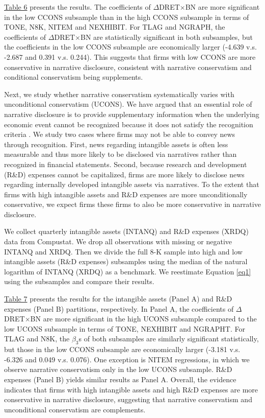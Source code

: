 \documentclass[letterpaper,12pt]{article}
\begin{document}
\begin{spacing}{1.5}
\hyperref[T6]{Table 6} presents the results. The coefficients of $\Delta$DRET$\times$BN are more significant in the low CCONS subsample than in the high CCONS subsample in terms of TONE, N8K, NITEM and NEXHIBIT. For TLAG and NGRAPH, the coefficients of $\Delta$DRET$\times$BN are statistically significant in both subsamples, but the coefficients in the low CCONS subsample are economically larger (-4.639 v.s. -2.687 and 0.391 v.s. 0.244). This suggests that firms with low CCONS are more conservative in narrative disclosure, consistent with narrative conservatism and conditional conservatism being supplements.

Next, we study whether narrative conservatism systematically varies with unconditional conservatism (UCONS). We have argued that an essential role of narrative disclosure is to provide supplementary information when the underlying economic event cannot be recognized because it does not satisfy the recognition criteria \cite{fasbStatementFinancialAccounting1984}. We study two cases where firms may not be able to convey news through recognition. First, news regarding intangible assets is often less measurable and thus more likely to be disclosed via narratives rather than recognized in financial statements. Second, because research and development (R\&D) expenses cannot be capitalized, firms are more likely to disclose news regarding internally developed intangible assets via narratives. To the extent that firms with high intangible assets and R\&D expenses are more unconditionally conservative, we expect firms these firms to also be more conservative in narrative disclosure.

We collect quarterly intangible assets (INTANQ) and R\&D expenses (XRDQ) data from Compustat. We drop all observations with missing or negative INTANQ and XRDQ. Then we divide the full 8-K sample into high and low intangible assets (R\&D expenses) subsamples using the median of the natural logarithm of INTANQ (XRDQ) as a benchmark. We reestimate Equation \eqref{eq1} using the subsamples and compare their results.

\hyperref[T7]{Table 7} presents the results for the intangible assets (Panel A) and R\&D expenses (Panel B) partitions, respectively. In Panel A, the coefficients of $\Delta$DRET$\times$BN are more significant in the high UCONS subsample compared to the low UCONS subsample in terms of TONE, NEXHIBIT and NGRAPHT. For TLAG and N8K, the $\beta_3$s of both subsamples are similarly significant statistically, but those in the low CCONS subsample are economically larger (-3.181 v.s. -6.326 and 0.049 v.s. 0.076). One exception is NITEM regressions, in which we observe narrative conservatism only in the low UCONS subsample. R\&D expenses (Panel B) yields similar results as Panel A. Overall, the evidence indicates that firms with high intangible assets and high R\&D expenses are more conservative in narrative disclosure, suggesting that narrative conservatism and unconditional conservatism are complements.


\end{spacing}
\end{document}
